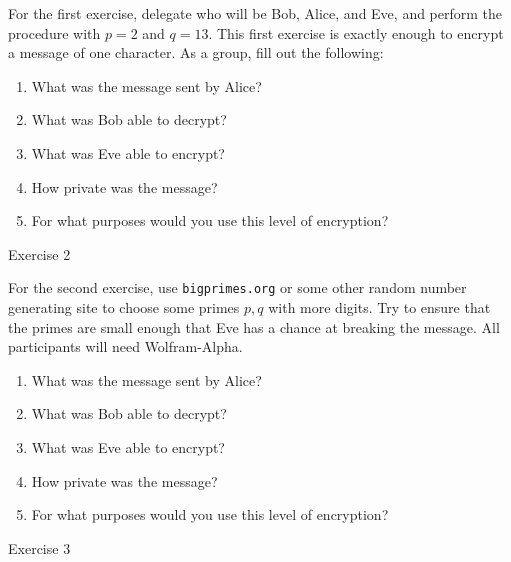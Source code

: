\documentclass{article}
\begin{document}
    For the first exercise, delegate who will be Bob, Alice, and Eve, and perform the procedure with $p=2$ and $q=13$. This first exercise is exactly enough to encrypt a message of one character. As a group, fill out the following:
    \begin{enumerate}
        \item What was the message sent by Alice? 

            \TextField[width=6in,height=1in]{}

        \item What was Bob able to decrypt?

            \TextField[width=6in,height=1in]{}

        \item What was Eve able to encrypt?

            \TextField[width=6in,height=1in]{}

        \item How private was the message?

            \TextField[width=6in,height=1in]{}

        \item For what purposes would you use this level of encryption?

            \TextField[width=6in,height=1in]{}

    \end{enumerate}

\newpage

    \huge Exercise 2
    \normalsize

    For the second exercise, use \verb|bigprimes.org| or some other random number generating site to choose some primes $p,q$ with more digits. Try to ensure that the primes are small enough that Eve has a chance at breaking the message. All participants will need Wolfram-Alpha.

    \begin{enumerate}
        \item What was the message sent by Alice? 

            \TextField[width=6in,height=1in]{}

        \item What was Bob able to decrypt?

            \TextField[width=6in,height=1in]{}

        \item What was Eve able to encrypt?

            \TextField[width=6in,height=1in]{}

        \item How private was the message?

            \TextField[width=6in,height=1in]{}

        \item For what purposes would you use this level of encryption?

            \TextField[width=6in,height=1in]{}

    \end{enumerate}
    \newpage
    \huge Exercise 3
    \normalsize
\end{document}
